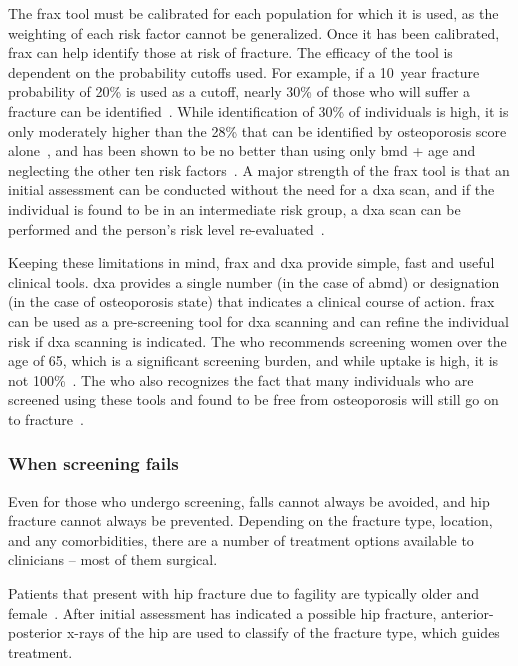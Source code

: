 The \ac{frax} tool must be calibrated for each population for which it is used, as the weighting of each risk factor cannot be generalized.
Once it has been calibrated, \ac{frax} can help identify those at risk of fracture.
The efficacy of the tool is dependent on the probability cutoffs used.
For example, if a 10~year fracture probability of 20\% is used as a cutoff, nearly 30\% of those who will suffer a fracture can be identified~\cite{leslie_fracture_2011}.
While identification of 30\% of individuals is high, it is only moderately higher than the 28\% that can be identified by osteoporosis score alone~\citep{stone_bmd_2003}, and has been shown to be no better than using only \ac{bmd} + age and neglecting the other ten risk factors~\citep{van_den_bergh_assessment_2010}.
A major strength of the \ac{frax} tool is that an initial assessment can be conducted without the need for a \ac{dxa} scan, and if the individual is found to be in an intermediate risk group, a \ac{dxa} scan can be performed and the person's risk level re-evaluated~\citep{kanis_frax_2009}.

Keeping these limitations in mind, \ac{frax} and \ac{dxa} provide simple, fast and useful clinical tools.
\ac{dxa} provides a single number (in the case of \ac{abmd}) or designation (in the case of osteoporosis state) that indicates a clinical course of action.
\ac{frax} can be used as a pre-screening tool for \ac{dxa} scanning and can refine the individual risk if \ac{dxa} scanning is indicated.
The \ac{who} recommends screening women over the age of 65, which is a significant screening burden, and while uptake is high, it is not 100\%~\citep[p.~101]{who_study_group_assessment_1994}.
The \ac{who} also recognizes the fact that many individuals who are screened using these tools and found to be free from osteoporosis will still go on to fracture~\citep[p.~99]{who_study_group_assessment_1994}.
		
\subsubsection{When screening fails}
\label{sec:fractures_clinic_fail}
Even for those who undergo screening, falls cannot always be avoided, and hip fracture cannot always be prevented.
Depending on the fracture type, location, and any comorbidities, there are a number of treatment options available to clinicians -- most of them surgical.

Patients that present with hip fracture due to fagility are typically older and female~\citep{cummings_epidemiology_2002}.
After initial assessment has indicated a possible hip fracture, anterior-posterior x-rays of the hip are used to classify of the fracture type, which guides treatment.

